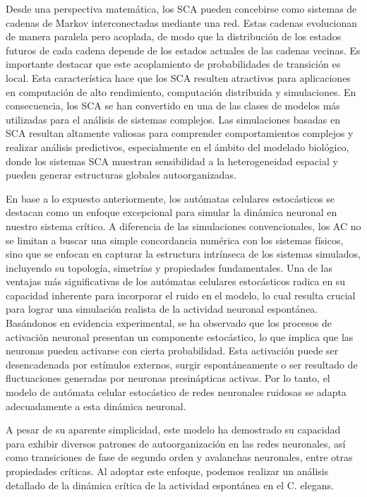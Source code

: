 Desde una perspectiva matemática, los SCA pueden concebirse como sistemas de cadenas de Markov interconectadas mediante una red. Estas cadenas evolucionan de manera paralela pero acoplada, de modo que la distribución de los estados futuros de cada cadena depende de los estados actuales de las cadenas vecinas. Es importante destacar que este acoplamiento de probabilidades de transición es local. Esta característica hace que los SCA resulten atractivos para aplicaciones en computación de alto rendimiento, computación distribuida y simulaciones.  En consecuencia, los SCA se han convertido en una de las clases de modelos más utilizadas para el análisis de sistemas complejos. Las simulaciones basadas en SCA resultan altamente valiosas para comprender comportamientos complejos y realizar análisis predictivos, especialmente en el ámbito del modelado biológico, donde los sistemas SCA muestran sensibilidad a la heterogeneidad espacial y pueden generar estructuras globales autoorganizadas.



En base a lo expuesto anteriormente, los autómatas celulares estocásticos  se destacan como un enfoque excepcional para simular la dinámica neuronal en nuestro sistema crítico.  A diferencia de las simulaciones convencionales, los AC no se limitan a buscar una simple concordancia numérica con los sistemas físicos, sino que se enfocan en capturar la estructura intrínseca de los sistemas simulados, incluyendo su topología, simetrías y propiedades fundamentales. Una de las ventajas más significativas de los autómatas celulares estocásticos radica en su capacidad inherente para incorporar el ruido en el modelo, lo cual resulta crucial para lograr una simulación realista de la actividad neuronal espontánea.  Basándonos en evidencia experimental, se ha observado que los procesos de activación neuronal presentan un componente estocástico, lo que implica que las neuronas pueden activarse con cierta probabilidad. Esta activación puede ser desencadenada por estímulos externos, surgir espontáneamente o ser resultado de fluctuaciones generadas por neuronas presinápticas activas. Por lo tanto, el modelo de autómata celular estocástico de redes neuronales ruidosas se adapta adecuadamente a esta dinámica neuronal.

A pesar de su aparente simplicidad, este modelo ha demostrado su capacidad para exhibir diversos patrones de autoorganización en las redes neuronales, así como transiciones de fase de segundo orden y avalanchas neuronales, entre otras propiedades críticas. Al adoptar este enfoque, podemos realizar un análisis detallado de la dinámica crítica de la actividad espontánea en el C. elegans.

